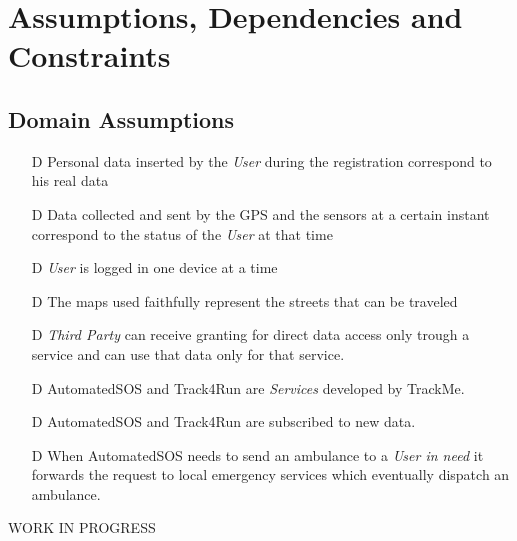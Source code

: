 \documentclass[../../rasd.tex]{subfiles}
\begin{document}
\section{Assumptions, Dependencies and Constraints}
		\subsection{Domain Assumptions}
			 	\begin{itemize}
				 	\item[D\subs{1}]Personal data inserted by the \textit{User} during the registration correspond to his real data
					\item[D\subs{2}]Data collected and sent by the GPS and the sensors at a certain instant correspond to the status of the \textit{User} at that time
				
					\item[D\subs{3}]\textit{User} is logged in one device at a time

					\item[D\subs{4}]The maps used faithfully represent the streets that can be traveled
					\item[D\subs{5}]\textit{Third Party} can receive granting for direct data access only trough a service and can use that data only for that service.
					\item[D\subs{6}]AutomatedSOS and Track4Run are \textit{Services} developed by TrackMe.
					\item[D\subs{7}]AutomatedSOS and Track4Run are subscribed to new data.
					\item[D\subs{8}]When AutomatedSOS needs to send an ambulance to a \textit{User in need} it forwards the request to local emergency services which eventually dispatch an ambulance.
					
				\end{itemize}
		WORK IN PROGRESS
		
\end{document}
